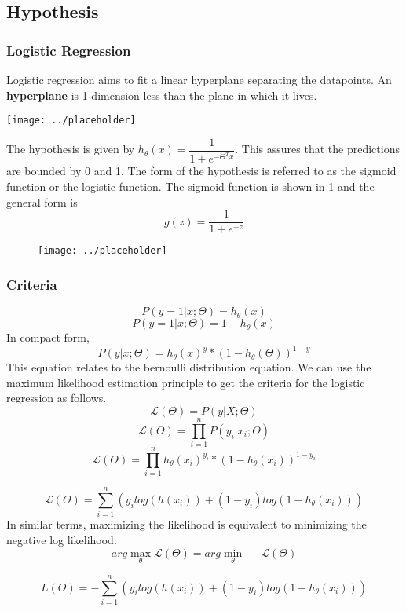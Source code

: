 \documentclass[12pt,a4paper,titlepage,landscape]{book}
\begin{document}
	 
	\subsection{Hypothesis}
	\subsubsection{Logistic Regression}
	Logistic regression aims to fit a linear hyperplane separating the datapoints. An \textbf{hyperplane} is 1 dimension less than the plane in which it lives. 
	
	\begin{center}
		\texttt{[image: ../placeholder]}
	\end{center}
	The hypothesis is given by  $h_\theta(x) = \dfrac{1}{1+e^{-\Theta^Tx}}$. This assures that the predictions are bounded by 0 and 1. The form of the hypothesis is referred to as the sigmoid function or the logistic function. The sigmoid function is shown in \ref{fig:sigmoid} and the general form is $$g(z) = \dfrac{1}{1+e^{-z}} $$
	
	\begin{figure}
		\centering
		\texttt{[image: ../placeholder]}
		\caption{}
		\label{fig:sigmoid}
	\end{figure}
	
	\subsubsection{Criteria}
	$$P(y = 1 | x;\Theta) = h_\theta(x)$$
	$$P(y = 1 | x;\Theta) = 1 - h_\theta(x)$$
	In compact form,
	$$P(y|x;\Theta) = h_\theta(x)^y * (1-h_\theta(\Theta))^{1-y}$$ 
	This equation relates to the bernoulli distribution equation. We can use the maximum likelihood estimation principle to get the criteria for the logistic regression as follows.
	$$\mathcal{L}(\Theta) = P(y|X;\Theta)$$
	$$\mathcal{L}(\Theta) = \prod_{i=1}^{n}P(y_i|x_i;\Theta)$$
	$$\mathcal{L}(\Theta) = \prod_{i=1}^{n}h_\theta(x_i)^{y_i} * (1-h_\theta(x_i))^{1-y_i}$$
	
	$$
		\mathcal{L}(\Theta) = \sum_{i=1}^{n}\left(y_ilog(h(x_i)) + (1-y_i)log(1-h_\theta(x_i))\right)
	$$
	In similar terms, maximizing the likelihood is equivalent to minimizing the negative log likelihood.
	$$arg\max\limits_{\theta}\mathcal{L}(\Theta) = arg\min\limits_{\theta}~-\mathcal{L}(\Theta)$$
	
	\begin{equation}\label{cross-entropy-loss}
	L(\Theta) = -\sum_{i=1}^{n}\left(y_ilog(h(x_i)) + (1-y_i)log(1-h_\theta(x_i))\right)
	\end{equation}
	
\end{document}
